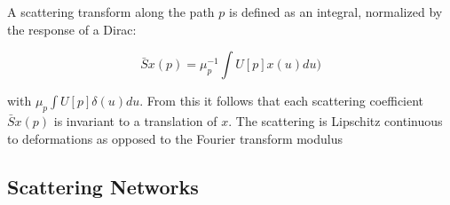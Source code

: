 A scattering transform along the path $p$ is defined as an integral, normalized by the response of a Dirac:

$$\bar{S}x(p) = \mu_p^{-1} \int U[p]x(u)du)$$

with $\mu_p \int U[p] \delta(u) du$. From this it follows that each scattering coefficient $\bar{S}x(p)$ is invariant to a translation of $x$. The scattering is Lipschitz continuous to deformations as opposed to the Fourier transform modulus


\subsection{Scattering Networks}

